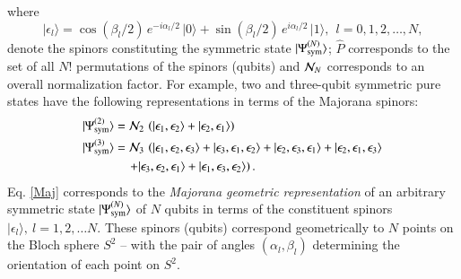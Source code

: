 {\noindent
where 
\begin{equation}
\vert\epsilon_l\rangle= \cos(\beta_l/2)\, e^{-i\alpha_l/2}\, \vert 0\rangle +\sin(\beta_l/2)\, e^{i\alpha_l/2} \, \vert 1\rangle,\ \ l=0,1,2,\ldots, N,\label{spinor}
\end{equation}
denote the spinors constituting the symmetric state $\vert \Psi^{(N)}_{\rm sym}\rangle$; $\hat{P}$ corresponds to the set of all $N!$ permutations of the spinors (qubits) and ${\cal N}_N$ corresponds to an overall normalization factor. For example, two and three-qubit symmetric pure states have the following representations in terms of the Majorana spinors:
\begin{align*}
\vert \Psi^{(2)}_{\rm sym}\rangle &={\cal N}_2\,  \left(\vert \epsilon_1, 
 \epsilon_2\rangle+  \vert \epsilon_2,\epsilon_1\rangle\right)\\
\vert \Psi^{(3)}_{\rm sym}\rangle &={\cal N}_3\,\left(  \vert \epsilon_1,
 \epsilon_2, \epsilon_3\rangle+  \vert \epsilon_3,\epsilon_1, \epsilon_2\rangle  + \vert \epsilon_2, 
 \epsilon_3, \epsilon_1\rangle +\vert \epsilon_2,\epsilon_1,\epsilon_3\rangle\right.\\
&\quad\left. + \vert \epsilon_3,\epsilon_2,\epsilon_1\rangle+ \vert \epsilon_1, \epsilon_3, \epsilon_2\rangle \right).
\end{align*}
Eq. \eqref{Maj} corresponds to the {\em Majorana geometric representation} of an arbitrary symmetric state $\vert \Psi^{(N)}_{\rm sym}\rangle$ of $N$ qubits in terms of the constituent spinors $\vert \epsilon_l \rangle,\  l=1,2,\ldots N$. These spinors (qubits) correspond geometrically to $N$ points on the  Bloch sphere $S^2$ \cite{makela,jpa4,markham1,markham2,gebastin, markham3} -- with the pair of angles $(\alpha_l,\beta_l)$ determining the orientation of each point on $S^2$.

}
